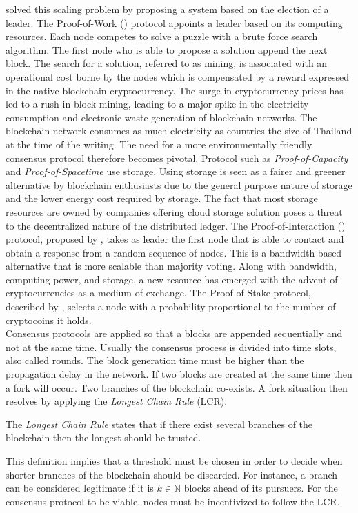 \noindent \citet{Na08} solved this scaling problem by proposing a system based on the election of a leader. The Proof-of-Work (\PoW) protocol appoints a leader based on its computing resources. Each node competes to solve a puzzle with a brute force search algorithm. The first node who is able to propose a solution append the next block. The search for a solution, referred to as mining, is associated with an operational cost borne by the nodes which is compensated by a reward expressed in the native blockchain cryptocurrency. The surge in cryptocurrency prices has led to a rush in block mining, leading to a major spike in the electricity consumption and electronic waste generation of blockchain networks. The blockchain network consumes as much electricity as countries the size of Thailand at the time of the writing. The need for a more environmentally friendly consensus protocol therefore becomes pivotal. Protocol such as \textit{Proof-of-Capacity} and \textit{Proof-of-Spacetime} use storage. Using storage is seen as a fairer and greener alternative by blockchain enthusiasts due to the general purpose nature of storage and the lower energy cost required by storage. The fact that most storage resources are owned by companies offering cloud storage solution poses a threat to the decentralized nature of the distributed ledger. The Proof-of-Interaction (\PoI) protocol, proposed by \citet{Abegg2021}, takes as leader the first node that is able to contact and obtain a response from a random sequence of nodes. This is a bandwidth-based alternative that is more scalable than majority voting. Along with bandwidth, computing power, and storage, a new resource has emerged with the advent of cryptocurrencies as a medium of exchange. The Proof-of-Stake protocol, described by \citet{Saleh2020}, selects a node with a probability proportional to the number of cryptocoins it holds. \\

\noindent Consensus protocols are applied so that a blocks are appended sequentially and not at the same time. Usually the consensus process is divided into time slots, also called rounds. The block generation time must be higher than the propagation delay in the network. If two blocks are created at the same time then a fork will occur. Two branches of the blockchain co-exists. A fork situation then resolves by applying the \textit{Longest Chain Rule} (LCR).
\begin{definition}
The \textit{Longest Chain Rule} states that if there exist several branches of the blockchain then the longest should be trusted.
\end{definition}  
\noindent This definition implies that a threshold must be chosen in order to decide when shorter branches of the blockchain should be discarded. For instance, a branch can be considered legitimate if it is $k\in\mathbb{N}$ blocks ahead of its pursuers.
For the consensus protocol to be viable, nodes must be incentivized to follow the LCR.\\

